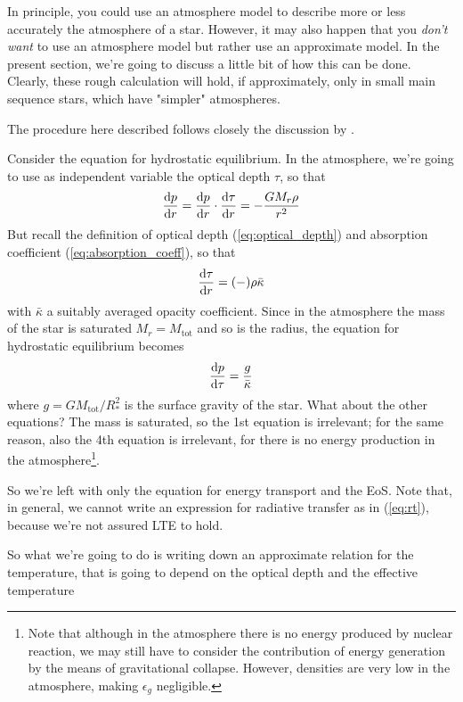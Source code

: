 \par In principle, you could use an atmosphere model to describe more or less accurately the atmosphere of a star. However, it may also happen that you \emph{don't want} to use an atmosphere model but rather use an approximate model. In the present section, we're going to discuss a little bit of how this can be done. Clearly, these rough calculation will hold, if approximately, only in small main sequence stars, which have "simpler" atmospheres.
\par The procedure here described follows closely the discussion by \cite{2005essp.book.....S}. 
\par Consider the equation for hydrostatic equilibrium. In the atmosphere, we're going to use as independent variable the optical depth $\tau$, so that
\begin{equation*}
    \frac{\text{d}p}{\text{d}r} = \frac{\text{d}p}{\text{d}r}\cdot\frac{\text{d}\tau}{\text{d}r} = -\frac{GM_{r}\rho}{r^{2}}
\end{equation*}
But recall the definition of optical depth (\ref{eq:optical_depth}) and absorption coefficient (\ref{eq:absorption_coeff}), so that
\begin{equation*}
    \frac{\text{d}\tau}{\text{d}r} = (-)\rho\bar{\kappa}
\end{equation*}
with $\bar{\kappa}$ a suitably averaged opacity coefficient. Since in the atmosphere the mass of the star is saturated $M_{r} = M_{\text{tot}}$ and so is the radius, the equation for hydrostatic equilibrium becomes
\begin{equation*}
    \frac{\text{d}p}{\text{d}\tau} = \frac{g}{\bar{\kappa}}
\end{equation*}
where $g = GM_{\text{tot}}/R_{*}^{2}$ is the surface gravity of the star. What about the other equations? The mass is saturated, so the 1st equation is irrelevant; for the same reason, also the 4th equation is irrelevant, for there is no energy production in the atmosphere\footnote{Note that although in the atmosphere there is no energy produced by nuclear reaction, we may still have to consider the contribution of energy generation by the means of gravitational collapse. However, densities are very low in the atmosphere, making $\epsilon_{g}$ negligible.}.
\par So we're left with only the equation for energy transport and the EoS. Note that, in general, we cannot write an expression for radiative transfer as in (\ref{eq:rt}), because we're not assured LTE to hold.
\par So what we're going to do is writing down an approximate relation for the temperature, that is going to depend on the optical depth and the effective temperature
